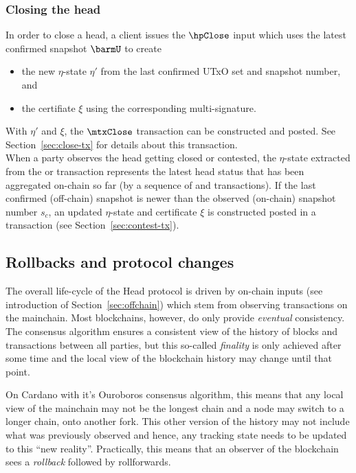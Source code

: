 \subsubsection{Closing the head}

\quad In order to close a head, a client issues the
$\hpClose$ input which uses the latest confirmed snapshot $\barmU$ to create
\begin{itemize}
	\item the new $\eta$-state $\eta'$ from the last confirmed UTxO set and snapshot
	      number, and
	\item the certifiate $\xi$ using the corresponding multi-signature.
\end{itemize}
With $\eta'$ and $\xi$, the $\mtxClose$ transaction can be constructed and
posted. See Section~\ref{sec:close-tx} for details about this transaction. \\

\quad When a party observes
the head getting closed or contested, the $\eta$-state extracted from the
\mtxClose{} or \mtxContest{} transaction represents the latest head status that
has been aggregated on-chain so far (by a sequence of \mtxClose{} and
\mtxContest{} transactions). If the last confirmed (off-chain) snapshot is newer
than the observed (on-chain) snapshot number $s_{c}$, an updated $\eta$-state
and certificate $\xi$ is constructed posted in a \mtxContest{} transaction (see
Section~\ref{sec:contest-tx}).

\subsection{Rollbacks and protocol changes}\label{sec:rollbacks}

The overall life-cycle of the Head protocol is driven by on-chain inputs (see
introduction of Section~\ref{sec:offchain}) which stem from observing
transactions on the mainchain. Most blockchains, however, do only provide
\emph{eventual} consistency. The consensus algorithm ensures a consistent view
of the history of blocks and transactions between all parties, but this
so-called \emph{finality} is only achieved after some time and the local view of
the blockchain history may change until that point.

On Cardano with it's Ouroboros consensus algorithm, this means that any local
view of the mainchain may not be the longest chain and a node may switch to a
longer chain, onto another fork. This other version of the history may not
include what was previously observed and hence, any tracking state needs to be
updated to this ``new reality''. Practically, this means that an observer of the
blockchain sees a \emph{rollback} followed by rollforwards.

